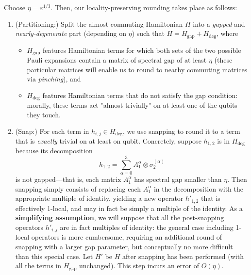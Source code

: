 \documentclass[a4paper,onecolumn,11pt]{quantumarticle}
\theoremstyle{plain}
\newcommand{\gap}{\mathrm{gap}}
\renewcommand{\deg}{\mathrm{deg}}
\newcommand{\eps}{\varepsilon}
\begin{document}
Choose $\eta =\eps^{1/3}$. Then, our locality-preserving rounding takes place as follows:
\begin{enumerate}
    \item (Partitioning:) Split the almost-commuting Hamiltonian $H$ into a \emph{gapped} and \emph{nearly-degenerate} part (depending on $\eta$) such that $H= H_{\gap} + H_{\deg}$, where
    \begin{itemize}
        \item $H_{\gap}$ features Hamiltonian terms for which both sets of the two possible Pauli expansions contain a matrix of spectral gap of at least $\eta$ (these particular matrices will enable us to round to nearby commuting matrices via \emph{pinching}), and

        \item $H_{\deg}$ features Hamiltonian terms that do not satisfy the gap condition: morally, these terms act "almost trivially" on at least one of the qubits they touch. 
    \end{itemize}
    \item (Snap:) For each term in $h_{i,j} \in H_{\deg}$, we use snapping to round it to a term that is \emph{exactly} trivial on at least on qubit. Concretely, suppose $h_{1,2}$ is in $H_{\deg}$ because its decomposition
    \[ h_{1,2} = \sum_{\alpha=0}^{3} A_1^\alpha \otimes \sigma_2^{(\alpha)}\]
    is not gapped---that is, each matrix $A_1^\alpha$ has spectral gap smaller than $\eta$. Then snapping simply consists of replacing each $A_1^\alpha$ in the decomposition with the appropriate multiple of identity, yielding a new operator $h'_{1,2}$ that is effectively 1-local, and may in fact be simply a multiple of the identity. As a \textbf{simplifying assumption}, we will suppose that all the post-snapping operators $h'_{i,j}$ are in fact multiples of identity: the general case including 1-local operators is more cumbersome, requiring an additional round of snapping with a larger gap parameter, but conceptually no more difficult than this special case. Let $H'$ be $H$ after snapping has been performed (with all the terms in $H_{\gap}$ unchanged). This step incurs an error of $O(\eta)$.


\end{enumerate}
\end{document}
